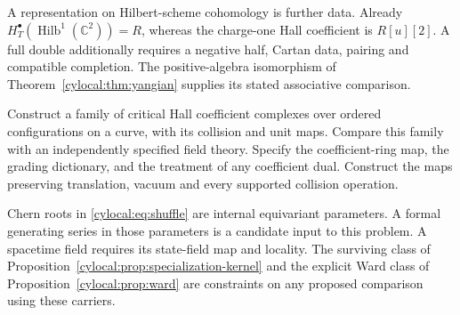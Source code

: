 A representation on Hilbert-scheme cohomology is further data.
Already $H_T^\bullet(\operatorname{Hilb}^1(\mathbb C^2))=R$,
whereas the charge-one Hall coefficient is $R[u][2]$.
A full double additionally requires a negative half, Cartan data,
pairing and compatible completion. The positive-algebra isomorphism
of Theorem~\ref{cylocal:thm:yangian} supplies its stated associative
comparison.

\begin{problem}\label{cylocal:prob:field-comparison}
Construct a family of critical Hall coefficient complexes over
ordered configurations on a curve, with its collision and unit maps.
Compare this family with an independently specified field theory.
Specify the coefficient-ring map, the grading dictionary, and the
treatment of any coefficient dual. Construct the maps preserving
translation, vacuum and every supported collision operation.
\end{problem}

Chern roots in \eqref{cylocal:eq:shuffle} are internal equivariant
parameters. A formal generating series in those parameters is a
candidate input to this problem. A spacetime field requires its
state-field map and locality. The surviving class of
Proposition~\ref{cylocal:prop:specialization-kernel} and the explicit
Ward class of Proposition~\ref{cylocal:prop:ward} are constraints on
any proposed comparison using these carriers.
